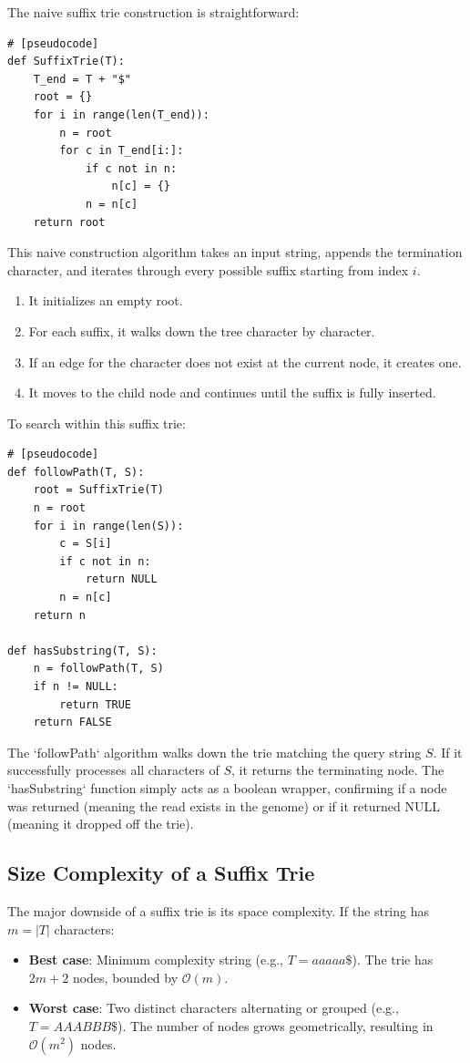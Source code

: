 The naive suffix trie construction is straightforward:

\begin{verbatim}
# [pseudocode]
def SuffixTrie(T):
    T_end = T + "$"
    root = {}
    for i in range(len(T_end)):
        n = root
        for c in T_end[i:]:
            if c not in n:
                n[c] = {}
            n = n[c]
    return root
\end{verbatim}

This naive construction algorithm takes an input string, appends the termination character, and iterates through every possible suffix starting from index $i$.
\begin{enumerate}
    \item It initializes an empty root.
    \item For each suffix, it walks down the tree character by character.
    \item If an edge for the character does not exist at the current node, it creates one.
    \item It moves to the child node and continues until the suffix is fully inserted.
\end{enumerate}

To search within this suffix trie:

\begin{verbatim}
# [pseudocode]
def followPath(T, S):
    root = SuffixTrie(T)
    n = root
    for i in range(len(S)):
        c = S[i]
        if c not in n:
            return NULL
        n = n[c]
    return n

def hasSubstring(T, S):
    n = followPath(T, S)
    if n != NULL:
        return TRUE
    return FALSE
\end{verbatim}

The `followPath` algorithm walks down the trie matching the query string $S$. If it successfully processes all characters of $S$, it returns the terminating node. The `hasSubstring` function simply acts as a boolean wrapper, confirming if a node was returned (meaning the read exists in the genome) or if it returned NULL (meaning it dropped off the trie). 

\subsection{Size Complexity of a Suffix Trie}

The major downside of a suffix trie is its space complexity. If the string has $m = |T|$ characters:
\begin{itemize}
    \item \textbf{Best case}: Minimum complexity string (e.g., $T = aaaaa\$$). The trie has $2m+2$ nodes, bounded by $\mathcal{O}(m)$.
    \item \textbf{Worst case}: Two distinct characters alternating or grouped (e.g., $T = AAABBB\$$). The number of nodes grows geometrically, resulting in $\mathcal{O}(m^2)$ nodes.
\end{itemize}


